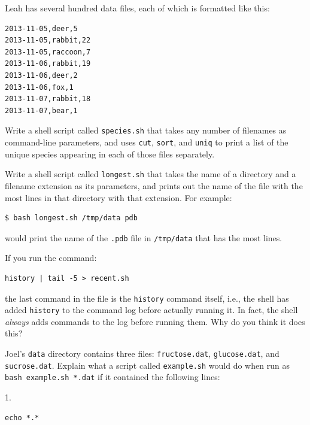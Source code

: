 \documentclass{book}
\begin{document}
\begin{swcenumerate}
\item
  Leah has several hundred data files, each of which is formatted like
  this:

\begin{verbatim}
2013-11-05,deer,5
2013-11-05,rabbit,22
2013-11-05,raccoon,7
2013-11-06,rabbit,19
2013-11-06,deer,2
2013-11-06,fox,1
2013-11-07,rabbit,18
2013-11-07,bear,1
\end{verbatim}

  Write a shell script called \texttt{species.sh} that takes any number
  of filenames as command-line parameters, and uses \texttt{cut},
  \texttt{sort}, and \texttt{uniq} to print a list of the unique species
  appearing in each of those files separately.
\item
  Write a shell script called \texttt{longest.sh} that takes the name of
  a directory and a filename extension as its parameters, and prints out
  the name of the file with the most lines in that directory with that
  extension. For example:

\begin{verbatim}
$ bash longest.sh /tmp/data pdb
\end{verbatim}

  would print the name of the \texttt{.pdb} file in \texttt{/tmp/data}
  that has the most lines.
\item
  If you run the command:

\begin{verbatim}
history | tail -5 > recent.sh
\end{verbatim}

  the last command in the file is the \texttt{history} command itself,
  i.e., the shell has added \texttt{history} to the command log before
  actually running it. In fact, the shell \emph{always} adds commands to
  the log before running them. Why do you think it does this?
\item
  Joel's \texttt{data} directory contains three files:
  \texttt{fructose.dat}, \texttt{glucose.dat}, and \texttt{sucrose.dat}.
  Explain what a script called \texttt{example.sh} would do when run as
  \texttt{bash example.sh *.dat} if it contained the following lines:
\end{swcenumerate}

1.

\begin{verbatim}
echo *.*
\end{verbatim}
\end{document}
